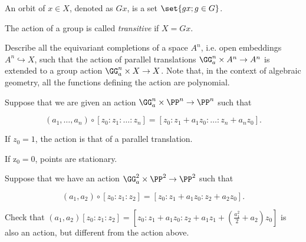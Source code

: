 \documentclass[11pt]{scrartcl}
\begin{document}
  \begin{definition}
    An orbit of $x\in X$, denoted as $Gx$, is a set
    $\set{gx; g\in G}$.
  \end{definition}

  The action of a group is called \textit{transitive} if $X = Gx$.

  \begin{problem*}
    \hfill
    
    Describe all the equivariant completions of a space $A^{n}$, i.e.
    open embeddings $A^{n} \hookrightarrow X$, such that the action of
    parallel translations $\GG_{a}^{n}\times A^{n} \to A^{n}$ is
    extended to a group action $\GG_{a}^{n}\times X \to X$. Note that,
    in the context of algebraic geometry, all the functions defining
    the action are polynomial.
  \end{problem*}

  \begin{example}

    Suppose that we are given an action
    $\GG_{a}^{n}\times \PP^{n} \to \PP^{n}$ such that
    
    \begin{equation*}
      (a_{1}, \dots, a_{n}) \circ [z_{0}:z_{1}:\dots:z_{n}] = [z_{0}: z_{1}+a_{1}z_{0}:\dots:z_{n}+a_{n}z_{0}].
    \end{equation*}

    If $z_{0} = 1$, the action is that of a parallel translation.

    If z$_{0} = 0$, points are stationary.
  \end{example}

  \begin{example}

    Suppose that we have an action
    $\GG_{a}^{2}\times \PP^{2} \to \PP^{2}$ such that

    \begin{equation*}
      (a_{1}, a_{2})\circ [z_{0}:z_{1}:z_{2}] = [z_{0}: z_{1}+a_{1}z_{0}:z_{2}+a_{2}z_{0}].
    \end{equation*}

    \begin{exercise}

      Check that
      $(a_{1}, a_{2})[z_{0}:z_{1}:z_{2}] =
      [z_{0}:z_{1}+a_{1}z_{0}:z_{2}+a_{1}z_{1}+(\frac{a_{1}^{2}}{2}+a_{2})z_{0}]$
      is also an action, but different from the action above.

    \end{exercise}


  \end{example}
\end{document}
